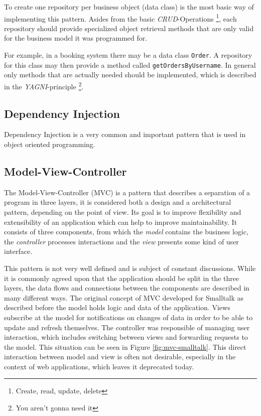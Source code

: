 To create one repository per business object (data class) is the most basic way of implementing this pattern. Asides from the basic \emph{CRUD}-Operations \footnote{Create, read, update, delete}, each repository should provide specialized object retrieval methods that are only valid for the business model it was programmed for. 

For example, in a booking system there may be a data class \texttt{Order}. A repository for this class may then provide a method called \texttt{getOrdersByUsername}. In general only methods that are actually needed should be implemented, which is described in the \emph{YAGNI}-principle \footnote{You aren't gonna need it}.

\subsection{Dependency Injection}
Dependency Injection is a very common and important pattern that is used in object oriented programming. 


\subsection{Model-View-Controller}
\label{sec:mvc}
The Model-View-Controller (MVC) is a pattern that describes a separation of a program in three layers, it is considered both a design and a architectural pattern, depending on the point of view.  Its goal is to improve flexibility and extensibility of an application which can help to improve maintainability. It consists of three components, from which the \emph{model} contains the business logic, the \emph{controller} processes interactions and the \emph{view} presents some kind of user interface. 

This pattern is not very well defined and is subject of constant discussions. While it is commonly agreed upon that the application should be split in the three layers, the data flows and connections between the components are described in many different ways. The original concept of MVC developed for Smalltalk as described before the model holds logic and data of the application. Views subscribe at the model for notifications on changes of data in order to be able to update and refresh themselves. The controller was responsible of managing user interaction, which includes switching between views and forwarding requests to the model. This situation can be seen in Figure \ref{fig:mvc-smalltalk}. This direct interaction between model and view is often not desirable, especially in the context of web applications, which leaves it deprecated today. 

